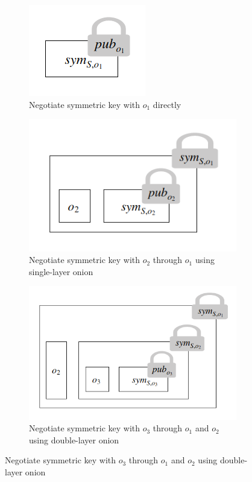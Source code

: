 \documentclass[10pt]{report}
\begin{document}
\begin{figure}[h]
    \begin{subfigure}{0.2\textwidth}
        \includegraphics[width=0.9\linewidth]{keyestab_01}
        \caption*{Negotiate symmetric key with $o_1$ directly}
    \end{subfigure}
    \begin{subfigure}{0.35\textwidth}
        \includegraphics[width=0.9\linewidth]{keyestab_02}
        \caption*{Negotiate symmetric key with $o_2$ through $o_1$ using single-layer onion}
    \end{subfigure}
    \begin{subfigure}{0.45\textwidth}
        \includegraphics[width=0.9\linewidth]{keyestab_03}
        \caption*{Negotiate symmetric key with $o_3$ through $o_1$ and $o_2$ using double-layer onion}
    \end{subfigure}
\end{figure}
\end{document}
